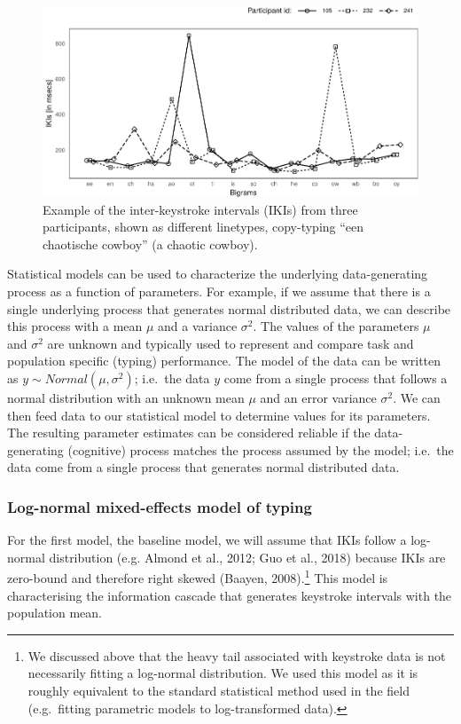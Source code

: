 \documentclass[
  english,
  man,mask,floatsintext]{apa7}
\begin{document}
\begin{figure}[bp!]

{\centering \includegraphics{report_v2_files/figure-latex/example2-1} 

}

\caption{Example of the inter-keystroke intervals (IKIs) from three participants, shown as different linetypes, copy-typing ``een chaotische cowboy'' (a chaotic cowboy).}\label{fig:example2}
\end{figure}

Statistical models can be used to characterize the underlying data-generating process as a function of parameters. For example, if we assume that there is a single underlying process that generates normal distributed data, we can describe this process with a mean \(\mu\) and a variance \(\sigma^2\). The values of the parameters \(\mu\) and \(\sigma^2\) are unknown and typically used to represent and compare task and population specific (typing) performance. The model of the data can be written as \(y \sim Normal(\mu, \sigma^2)\); i.e.~the data \(y\) come from a single process that follows a normal distribution with an unknown mean \(\mu\) and an error variance \(\sigma^2\). We can then feed data to our statistical model to determine values for its parameters. The resulting parameter estimates can be considered reliable if the data-generating (cognitive) process matches the process assumed by the model; i.e.~the data come from a single process that generates normal distributed data.

\hypertarget{log-normal-mixed-effects-model-of-typing}{%
\subsubsection{Log-normal mixed-effects model of typing}\label{log-normal-mixed-effects-model-of-typing}}

For the first model, the baseline model, we will assume that IKIs follow a log-normal distribution (e.g. Almond et al., 2012; Guo et al., 2018) because IKIs are zero-bound and therefore right skewed (Baayen, 2008).\footnote{We discussed above that the heavy tail associated with keystroke data is not necessarily fitting a log-normal distribution. We used this model as it is roughly equivalent to the standard statistical method used in the field (e.g.~fitting parametric models to log-transformed data).} This model is characterising the information cascade that generates keystroke intervals with the population mean.
\end{document}
